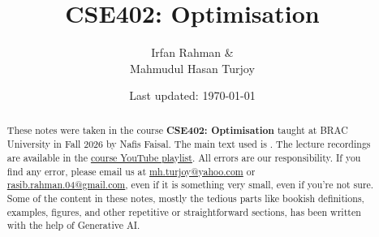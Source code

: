 \documentclass[11pt]{scrreprt}
\begin{document}
\title{CSE402: Optimisation}
\author{Irfan Rahman \&\\ Mahmudul Hasan Turjoy}
\date{Last updated: \today}
\maketitle

\begin{abstract}
	These notes were taken in the course \textbf{CSE402: Optimisation} taught at BRAC University in Fall 2026 by Nafis Faisal. The main text used is \cite{algoForOp}. The lecture recordings are available in the \href{https://www.youtube.com/playlist?list=PLCj8RxLiQjv4}{course YouTube playlist}. All errors are our responsibility. If you find any error, please email us at \href{mailto:mh.turjoy@yahoo.com}{mh.turjoy@yahoo.com} or \href{mailto:rasib.rahman.04@gmail.com}{rasib.rahman.04@gmail.com}, even if it is something very small, even if you're not sure. Some of the content in these notes, mostly the tedious parts like bookish definitions, examples, figures, and other repetitive or straightforward sections, has been written with the help of Generative AI.
\end{abstract}

\tableofcontents
























\printbibliography[title=References]
\end{document}
